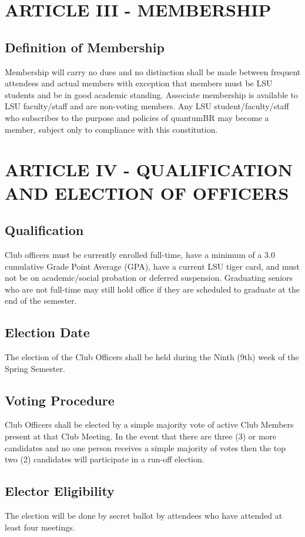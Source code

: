 \documentclass[11pt]{amsart}
\begin{document}
\section{ARTICLE III - MEMBERSHIP}
\subsection{Definition of Membership}
Membership will carry no dues and no distinction shall be made between frequent attendees and actual members with exception that members must be LSU students and be in good academic standing. Associate membership is available to LSU faculty/staff and are non-voting members. Any LSU student/faculty/staff who subscribes to the purpose and policies of quantumBR may become a member, subject only to compliance with this constitution.

\section{ARTICLE IV - QUALIFICATION AND ELECTION OF OFFICERS}
\subsection{Qualification}
Club officers must be currently enrolled full-time, have a minimum of a 3.0 cumulative Grade Point Average (GPA), have a current LSU tiger card, and must not be on academic/social probation or deferred suspension. Graduating seniors who are not full-time may still hold office if they are scheduled to graduate at the end of the semester.
\subsection{Election Date}
The election of the Club Officers shall be held during the Ninth (9th) week of the Spring Semester.
\subsection{Voting Procedure}
Club Officers shall be elected by a simple majority vote of active Club Members present at that Club Meeting. In the event that there are three (3) or more candidates and no one person receives a simple majority of votes then the top two (2) candidates will participate in a run-off election.
\subsection{Elector Eligibility}
The election will be done by secret ballot by attendees who have attended at least four meetings.
\end{document}
